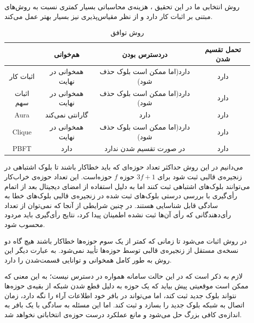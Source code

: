 روش انتخابی ما در این تحقیق
، هزینه‌ی محاسباتی بسیار کمتری نسبت به روش‌های مبتنی بر اثبات کار دارد و از نظر مقیاس‌پذیری
\cite{PBFperf}
نیز بسیار بهتر عمل می‌کند.

\begin{table}[th!]
	\begin{center}
		\caption{روش توافق}
		\begin{tabular}{|c|c|c|c|}
			\hline
			& هم‌خوانی & دردسترس بودن & تحمل تقسیم شدن \\
			\hline
			اثبات کار & همخوانی‌ در نهایت & دارد(اما ممکن است بلوک حذف شود) & دارد \\
			\hline
			اثبات سهم & همخوانی‌ در نهایت & دارد(اما ممکن است بلوک حذف شود) & دارد \\
			\hline
			Aura & گارانتی نمی‌کند & دارد & دارد \\
			\hline
			Clique & همخوانی‌ در نهایت & دارد(اما ممکن است بلوک حذف شود) & دارد \\
			\hline
			PBFT & دارد & در صورت تقسیم شدن ندارد & دارد \\
			\hline
		\end{tabular}
		\label{tab:cons}
	\end{center}
\end{table}

\par
می‌دانیم در این روش حداکثر تعداد حوزه‌ای که باید خطاکار باشند تا بلوک اشتباهی در زنجیره‌ی قالبی ثبت شود برای 
$3f + 1$
حوزه $f$ حوزه‌است.
این تعداد حوزه‌ی خراب‌کار می‌توانند بلوک‌های اشتباهی ثبت کنند اما به دلیل استفاده از امضای دیجیتال بعد از اتمام رأی‌گیری با بررسی درستی بلوک‌های ثبت شده در زنجیره‌ی قالبی بلوک‌های خطا به سادگی قابل شناسایی هستند. در چنین شرایطی از آنجا که نمی‌توان از تعداد رأی‌دهندگانی که رأی‌ آن‌ها ثبت نشده اطمینان پیدا کرد، نتایج رأی‌گیری باید مردود محسوب شود. 
\par
در روش  اثبات می‌شود 
\cite{bftcap}
تا زمانی که کمتر از یک سوم حوزه‌ها خطاکار باشند هیچ گاه دو نسخه‌ی مستقل از زنجیره‌ی قالبی توسط حوزه‌ها تأیید نمی‌شود. به عبارت دیگر این روش به طور کامل همخوانی و توانایی قسمت‌شدن را دارد.
\par
لازم به ذکر است که در این حالت سامانه همواره در دسترس نیست؛ به این معنی که ممکن است موقعیتی پیش بیاید که یک حوزه به دلیل قطع شدن شبکه از بقیه‌ی حوزه‌ها نتواند بلوک جدید ثبت کند، اما می‌تواند در بافر خود اطلاعات آراء را نگه دارد، زمان اتصال به شبکه بلوک جدید را بسازد و ثبت کند. اما این مسئله به سادگی با یک بافر به اندازه‌ی کافی بزرگ حل می‌شود و مانع عملکرد درست حوزه‌ی انتخاباتی ‌نخواهد شد.

